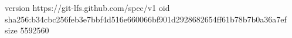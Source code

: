 version https://git-lfs.github.com/spec/v1
oid sha256:b34cbc256feb3e7bbf4d516e660066bf901d2928682654ff61b78b7b0a36a7ef
size 5592560
